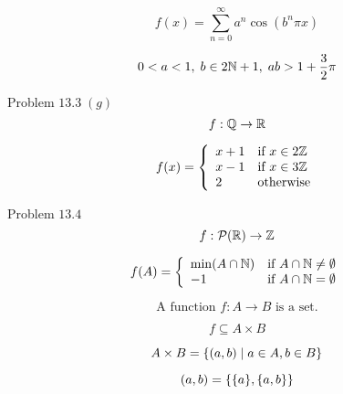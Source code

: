 \begin{frame}{}

  \[
    f(x)=\sum_{n=0} ^\infty a^n \cos(b^n \pi x) 
  \]

  \[
    0 < a < 1,\; b \in 2\mathbb{N} + 1,\; ab > 1+\frac{3}{2} \pi
  \]
\end{frame}

\begin{frame}{}
  \begin{exampleblock}{Problem $13.3\; (g)$}
    \[
      f: \mathbb{Q} \to \mathbb{R}{}
    \]

    \[
      f(x) = \left\{\begin{array}{ll}
	x + 1 & \text{if } x \in 2\mathbb{Z}{} \\
	x - 1 & \text{if } x \in 3\mathbb{Z}{} \\
	2     & \text{otherwise}
      \end{array}\right.
    \]
  \end{exampleblock}
\end{frame}

\begin{frame}{}
  \begin{exampleblock}{Problem $13.4$}
    \[
      f: \mathcal{P}(\mathbb{R}{}) \to \mathbb{Z}{}
    \]

    \[
      f(A) = \left\{\begin{array}{ll}
	\min(A \cap \mathbb{N}{}) & \text{if } A \cap \mathbb{N}{} \neq \emptyset \\
	-1 & \text{if } A \cap \mathbb{N}{} = \emptyset
      \end{array}\right.
    \]
  \end{exampleblock}
\end{frame}

\begin{frame}{}
  \[
    \text{A function } f: A \to B \text{ is a set.}
  \]

  \[
    f \subseteq A \times B
  \]

  \[
    A \times B = \{(a,b) \mid a \in A, b \in B\}
  \]

  \[
    (a,b) = \{\{a\}, \{a,b\}\}
  \]
\end{frame}


